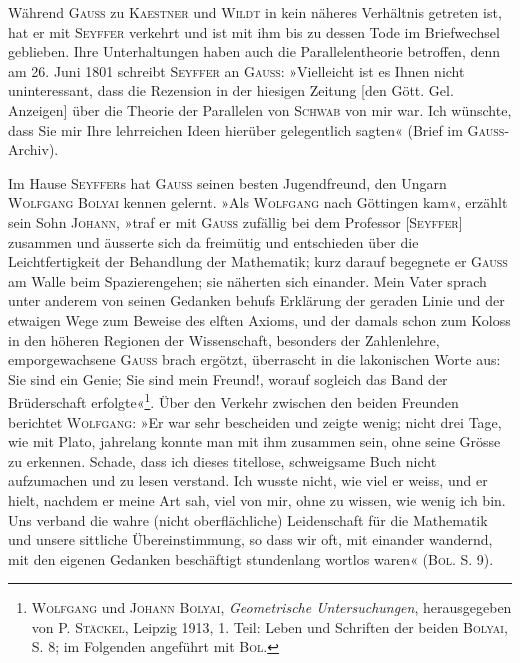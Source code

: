 Während \textsc{Gauss} zu \textsc{Kaestner} und \textsc{Wildt} in kein näheres Verhältnis getreten
ist, hat er mit \textsc{Seyffer} verkehrt und ist mit ihm bis zu dessen Tode
im Briefwechsel geblieben. Ihre Unterhaltungen haben auch die Parallelentheorie
betroffen, denn am 26. Juni 1801 schreibt \textsc{Seyffer} an \textsc{Gauss}: »Vielleicht
ist es Ihnen nicht uninteressant, dass die Rezension in der hiesigen
Zeitung [den Gött. Gel. Anzeigen] über die Theorie der Parallelen von \textsc{Schwab}
von mir war. Ich wünschte, dass Sie mir Ihre lehrreichen Ideen hierüber
gelegentlich sagten« (Brief im \textsc{Gauss}-Archiv).
\par
Im Hause \textsc{Seyffer}s hat \textsc{Gauss} seinen besten Jugendfreund, den Ungarn
\textsc{Wolfgang Bolyai} kennen gelernt. »Als \textsc{Wolfgang} nach Göttingen kam«,
erzählt sein Sohn \textsc{Johann}, »traf er mit \textsc{Gauss} zufällig bei dem Professor
[\textsc{Seyffer}] zusammen und äusserte sich da freimütig und entschieden über die
Leichtfertigkeit der Behandlung der Mathematik; kurz darauf begegnete er
\textsc{Gauss} am Walle beim Spazierengehen; sie näherten sich einander. Mein
Vater sprach unter anderem von seinen Gedanken behufs Erklärung der geraden
Linie und der etwaigen Wege zum Beweise des elften Axioms, und
der damals schon zum Koloss in den höheren Regionen der Wissenschaft,
besonders der Zahlenlehre, emporgewachsene \textsc{Gauss} brach ergötzt, überrascht
in die lakonischen Worte aus: Sie sind ein Genie; Sie sind mein Freund!,
worauf sogleich das Band der Brüderschaft erfolgte«\footnote{\textsc{Wolfgang} und \textsc{Johann Bolyai}, \textit{Geometrische Untersuchungen}, herausgegeben von P. \textsc{Stäckel}, Leipzig 1913, 1. Teil: Leben und Schriften der beiden \textsc{Bolyai}, S. 8; im Folgenden angeführt mit \textsc{Bol.}}. Über den Verkehr
zwischen den beiden Freunden berichtet \textsc{Wolfgang}: »Er war sehr bescheiden
und zeigte wenig; nicht drei Tage, wie mit Plato, jahrelang konnte man mit
ihm zusammen sein, ohne seine Grösse zu erkennen. Schade, dass ich dieses
titellose, schweigsame Buch nicht aufzumachen und zu lesen verstand. Ich
wusste nicht, wie viel er weiss, und er hielt, nachdem er meine Art sah, viel
von mir, ohne zu wissen, wie wenig ich bin. Uns verband die wahre (nicht
oberflächliche) Leidenschaft für die Mathematik und unsere sittliche Übereinstimmung,
so dass wir oft, mit einander wandernd, mit den eigenen Gedanken
beschäftigt stundenlang wortlos waren« (\textsc{Bol.} S. 9).
\clearpage{}\setcounter{footnote}{0}
